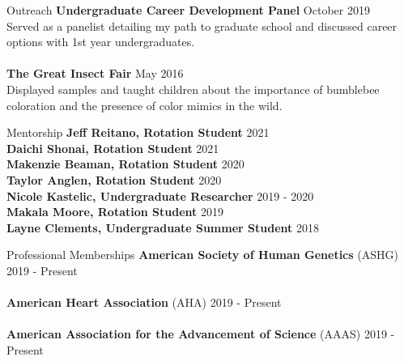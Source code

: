 \documentclass{resume} %
\begin{document}
\begin{rSection}{Outreach}
{\bf Undergraduate Career Development Panel} \hfill {October 2019}\\
Served as a panelist detailing my path to graduate school and discussed career options with 1st year undergraduates.\\\\
{\bf The Great Insect Fair} \hfill {May 2016}\\
Displayed samples and taught children about the importance of bumblebee coloration and the presence of color mimics in the wild.\\

\end{rSection}


\begin{rSection}{Mentorship}
{\bf Jeff Reitano, Rotation Student} \hfill {2021}\\
{\bf Daichi Shonai, Rotation Student} \hfill {2021}\\
{\bf Makenzie Beaman, Rotation Student} \hfill {2020}\\
{\bf Taylor Anglen, Rotation Student} \hfill {2020}\\
{\bf Nicole Kastelic, Undergraduate Researcher} \hfill {2019 - 2020}\\
{\bf Makala Moore, Rotation Student} \hfill {2019}\\
{\bf Layne Clements, Undergraduate Summer Student} \hfill {2018}\\

\end{rSection}


\begin{rSection}{Professional Memberships}
{\bf American Society of Human Genetics} (ASHG)  \hfill {2019 - Present} 
\\ \\
{\bf American Heart Association} (AHA) \hfill {2019 - Present} 
\\ \\
{\bf American Association for the Advancement of Science} (AAAS) \hfill {2019 - Present} 
\\
\end{rSection}
\end{document}
